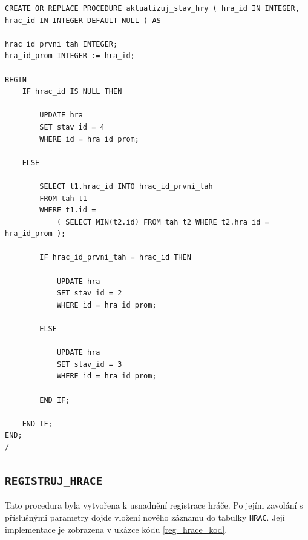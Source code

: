 \documentclass[
11pt,
a4paper,
pdftex,
czech,
titlepage
]{report}
\begin{document}
\renewcommand{\lstlistingname}{Ukázka kódu}
\begin{lstlisting}
CREATE OR REPLACE PROCEDURE aktualizuj_stav_hry ( hra_id IN INTEGER, hrac_id IN INTEGER DEFAULT NULL ) AS

hrac_id_prvni_tah INTEGER;
hra_id_prom INTEGER := hra_id;
    
BEGIN
    IF hrac_id IS NULL THEN
    
        UPDATE hra
        SET stav_id = 4
        WHERE id = hra_id_prom;
        
    ELSE
    
        SELECT t1.hrac_id INTO hrac_id_prvni_tah
        FROM tah t1
		WHERE t1.id = 
			( SELECT MIN(t2.id) FROM tah t2 WHERE t2.hra_id = hra_id_prom );
        
        IF hrac_id_prvni_tah = hrac_id THEN
            
            UPDATE hra
            SET stav_id = 2
            WHERE id = hra_id_prom;
                
        ELSE
        
            UPDATE hra
            SET stav_id = 3
            WHERE id = hra_id_prom;
        
        END IF;
        
    END IF;
END;
/
\end{lstlisting}

\subsection{\texttt{REGISTRUJ\_HRACE}}\label{reg_hrace_kap}
Tato procedura byla vytvořena k usnadnění registrace hráče. Po jejím zavolání s příslušnými parametry dojde vložení nového záznamu do tabulky \texttt{HRAC}. Její implementace je zobrazena v ukázce kódu \ref{reg_hrace_kod}.
\end{document}
